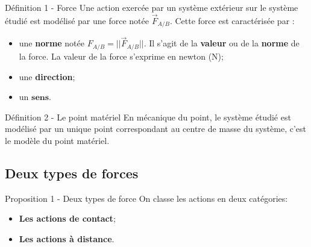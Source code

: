 \documentclass[french, a4paper, 12pt, twocolumn, landscape]{article}
\begin{document}
\begin{definition}{Définition 1 - Force}
	Une action exercée par un système extérieur sur le système étudié est modélisé par une force notée $\overrightarrow{F}_{A/B}$. Cette force est caractérisée par : 

	\begin{itemize}
		\item une \textbf{norme} notée $F_{A/B} = ||\overrightarrow{F}_{A/B}||$. Il s'agit de la \textbf{valeur} ou de la \textbf{norme} de la force. La valeur de la force s'exprime en newton (N);
		\item une \textbf{direction};
		\item un $\textbf{sens}$.
	\end{itemize}
\end{definition}

\begin{definition}{Définition 2 - Le point matériel}
	En mécanique du point, le système étudié est modélisé par un unique point correspondant au centre de masse du système, c'est le modèle du point matériel.
\end{definition}


\begin{figure}[!ht]
\centering
{}
\end{figure}


\subsection{Deux types de forces}

\begin{Proposition}{Proposition 1 - Deux types de force}
	On classe les actions en deux catégories: 

	\begin{itemize}
		\item \textbf{Les actions de contact};
		\item \textbf{Les actions à distance}.
	\end{itemize}
\end{Proposition}
\end{document}
